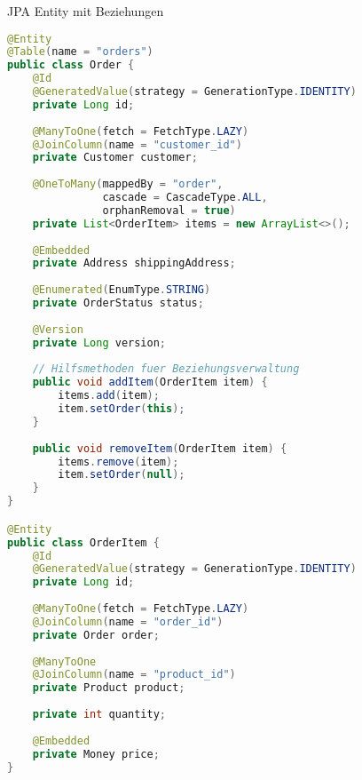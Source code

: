 \begin{example}{JPA Entity mit Beziehungen}
\begin{lstlisting}[language=Java]
@Entity
@Table(name = "orders")
public class Order {
    @Id
    @GeneratedValue(strategy = GenerationType.IDENTITY)
    private Long id;
    
    @ManyToOne(fetch = FetchType.LAZY)
    @JoinColumn(name = "customer_id")
    private Customer customer;
    
    @OneToMany(mappedBy = "order", 
               cascade = CascadeType.ALL,
               orphanRemoval = true)
    private List<OrderItem> items = new ArrayList<>();
    
    @Embedded
    private Address shippingAddress;
    
    @Enumerated(EnumType.STRING)
    private OrderStatus status;
    
    @Version
    private Long version;
    
    // Hilfsmethoden fuer Beziehungsverwaltung
    public void addItem(OrderItem item) {
        items.add(item);
        item.setOrder(this);
    }
    
    public void removeItem(OrderItem item) {
        items.remove(item);
        item.setOrder(null);
    }
}

@Entity
public class OrderItem {
    @Id
    @GeneratedValue(strategy = GenerationType.IDENTITY)
    private Long id;
    
    @ManyToOne(fetch = FetchType.LAZY)
    @JoinColumn(name = "order_id")
    private Order order;
    
    @ManyToOne
    @JoinColumn(name = "product_id")
    private Product product;
    
    private int quantity;
    
    @Embedded
    private Money price;
}
\end{lstlisting}
\end{example}


